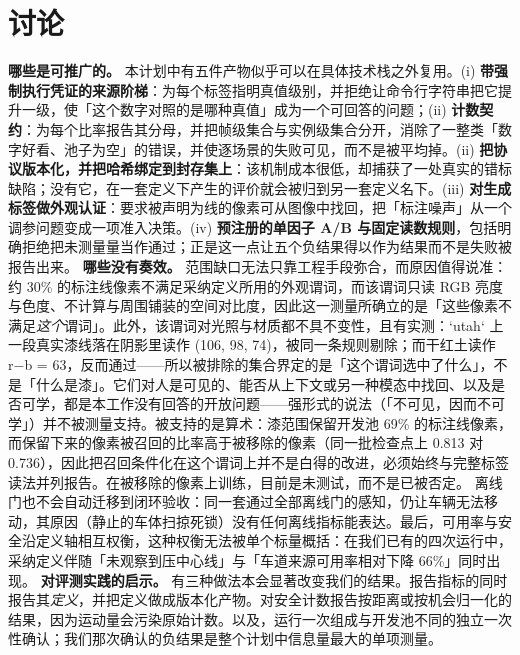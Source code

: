 \documentclass[journal]{IEEEtran}
\begin{document}
\section{讨论}
\textbf{哪些是可推广的。} 本计划中有五件产物似乎可以在具体技术栈之外复用。(i) \textbf{带强制执行凭证的来源阶梯}：为每个标签指明真值级别，并拒绝让命令行字符串把它提升一级，使「这个数字对照的是哪种真值」成为一个可回答的问题；(ii) \textbf{计数契约}：为每个比率报告其分母，并把帧级集合与实例级集合分开，消除了一整类「数字好看、池子为空」的错误，并使逐场景的失败可见，而不是被平均掉。(ii) \textbf{把协议版本化，并把哈希绑定到封存集上}：该机制成本很低，却捕获了一处真实的错标缺陷；没有它，在一套定义下产生的评价就会被归到另一套定义名下。(iii) \textbf{对生成标签做外观认证}：要求被声明为线的像素可从图像中找回，把「标注噪声」从一个调参问题变成一项准入决策。(iv) \textbf{预注册的单因子 A/B 与固定读数规则}，包括明确拒绝把未测量量当作通过；正是这一点让五个负结果得以作为结果而不是失败被报告出来。
\textbf{哪些没有奏效。} 范围缺口无法只靠工程手段弥合，而原因值得说准：约 30\% 的标注线像素不满足采纳定义所用的外观谓词，而该谓词只读 RGB 亮度与色度、不计算与周围铺装的空间对比度，因此这一测量所确立的是「这些像素不满足\emph{这个}谓词」。此外，该谓词对光照与材质都不具不变性，且有实测：`utah` 上一段真实漆线落在阴影里读作 (106, 98, 74)，被同一条规则剔除；而干红土读作 r−b = 63，反而通过------所以被排除的集合界定的是「这个谓词选中了什么」，不是「什么是漆」。它们对人是可见的、能否从上下文或另一种模态中找回、以及是否可学，都是本工作没有回答的开放问题------强形式的说法（「不可见，因而不可学」）并不被测量支持。被支持的是算术：漆范围保留开发池 69\% 的标注线像素，而保留下来的像素被召回的比率高于被移除的像素（同一批检查点上 0.813 对 0.736），因此把召回条件化在这个谓词上并不是白得的改进，必须始终与完整标签读法并列报告。在被移除的像素上训练，目前是未测试，而不是已被否定。
离线门也不会自动迁移到闭环验收：同一套通过全部离线门的感知，仍让车辆无法移动，其原因（静止的车体扫掠死锁）没有任何离线指标能表达。最后，可用率与安全沿定义轴相互权衡，这种权衡无法被单个标量概括：在我们已有的四次运行中，采纳定义伴随「未观察到压中心线」与「车道来源可用率相对下降 66\%」同时出现。
\textbf{对评测实践的启示。} 有三种做法本会显著改变我们的结果。报告指标的同时报告其\emph{定义}，并把定义做成版本化产物。对安全计数报告按距离或按机会归一化的结果，因为运动量会污染原始计数。以及，运行一次组成与开发池不同的独立一次性确认；我们那次确认的负结果是整个计划中信息量最大的单项测量。
\end{document}
